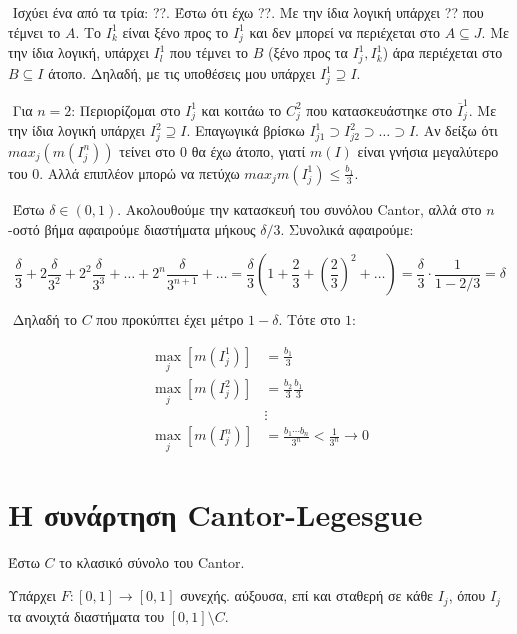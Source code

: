 $ $\newline
Ισχύει ένα από τα τρία: ??. Έστω ότι έχω ??. Με την ίδια λογική υπάρχει ?? που τέμνει το $A$. Το $I^1_k$ είναι ξένο προς το $I^1_j$ και δεν μπορεί να περιέχεται στο $A \subseteq J$. Με την ίδια λογική, υπάρχει $I^1_l$ που τέμνει το $B$ (ξένο προς τα $I^1_j, I^1_k$) άρα περιέχεται στο $B \subseteq I$ άτοπο. Δηλαδή, με τις υποθέσεις μου υπάρχει $I^1_j \supseteq I$.

$ $\newline
Για $n=2$: Περιορίζομαι στο $I^1_j$ και κοιτάω το $C^2_j$ που κατασκευάστηκε στο $\overline{I}^1_j$. Με την ίδια λογική υπάρχει $I^2_j \supseteq I$. Επαγωγικά βρίσκω $I^1_{j1} \supset I^2_{j2} \supset \ldots \supset I$. Αν δείξω ότι $max_j (m(I^n_j))$ τείνει στο $0$ θα έχω άτοπο, γιατί $m(I)$ είναι γνήσια μεγαλύτερο του $0$. Αλλά επιπλέον μπορώ να πετύχω $max_j m(I^1_j) \leq \frac{b_1}{3}$.

$ $\newline
Έστω $\delta \in (0,1)$. Ακολουθούμε την κατασκευή του συνόλου {\eng Cantor}, αλλά στο $n$-οστό βήμα αφαιρούμε διαστήματα μήκους $\delta/3$. Συνολικά αφαιρούμε:

$$\frac{\delta}{3} + 2\frac{\delta}{3^2} + 2^2 \frac{\delta}{3^3} + \ldots + 2^n \frac{\delta}{3^{n+1}} + \ldots = \frac{\delta}{3} \left( 1+ \frac{2}{3} + \left(\frac{2}{3}\right)^2 + \ldots \right) = \frac{\delta}{3} \cdot \frac{1}{1-2/3} = \delta$$

$ $\newline
Δηλαδή το $C$ που προκύπτει έχει μέτρο $1-\delta$. Τότε στο $1$: 

\begin{align*}
\max_j [m(I^1_j)] & = \frac{b_1}{3} \\
\max_j [m(I^2_j)] & = \frac{b_2}{3} \frac{b_1}{3} \\
&  \vdots \\
\max_j [m(I^n_j)] & = \frac{b_1 \cdots b_n}{3^n} < \frac{1}{3^n} \rightarrow 0
\end{align*}

\pagebreak

\section*{Η συνάρτηση {\eng Cantor-Legesgue}}

\noindent Έστω $C$ το κλασικό σύνολο του {\eng Cantor}.

\begin{theorem} Υπάρχει $F: [0,1]\rightarrow [0,1]$ συνεχής. αύξουσα, επί και σταθερή σε κάθε $I_j$, όπου $I_j$ τα ανοιχτά διαστήματα του $[0,1] \setminus C$.
\end{theorem}

